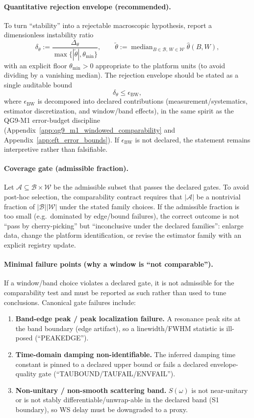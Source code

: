 \paragraph{Quantitative rejection envelope (recommended).}
\AuditTag To turn ``stability'' into a rejectable macroscopic hypothesis, report a dimensionless instability ratio
\[
\delta_\theta:=\frac{\Delta_\theta}{\max\{|\tilde\theta|,\theta_{\min}\}},
\qquad
\tilde\theta:=\operatorname{median}_{B\in\mathcal B,\,W\in\mathcal W}\widehat\theta(B,W),
\]
with an explicit floor $\theta_{\min}>0$ appropriate to the platform units (to avoid dividing by a vanishing median).
The rejection envelope should be stated as a single auditable bound
\[
\delta_\theta \le \epsilon_{\mathrm{BW}},
\]
where $\epsilon_{\mathrm{BW}}$ is decomposed into declared contributions (measurement/systematics, estimator discretization, and window/band effects),
in the same spirit as the QG9-M1 error-budget discipline (Appendix~\ref{app:qg9_m1_windowed_comparability} and Appendix~\ref{app:eft_error_bounds}).
If $\epsilon_{\mathrm{BW}}$ is not declared, the statement remains interpretive rather than falsifiable.

\paragraph{Coverage gate (admissible fraction).}
\AuditTag Let $\mathcal A\subseteq\mathcal B\times\mathcal W$ be the admissible subset that passes the declared gates.
To avoid post-hoc selection, the comparability contract requires that $|\mathcal A|$ be a nontrivial fraction of $|\mathcal B||\mathcal W|$ under the stated family choices.
If the admissible fraction is too small (e.g.\ dominated by edge/bound failures), the correct outcome is not ``pass by cherry-picking'' but ``inconclusive under the declared families'': enlarge data, change the platform identification, or revise the estimator family with an explicit registry update.

\paragraph{Minimal failure points (why a window is ``not comparable'').}
\AuditTag If a window/band choice violates a declared gate, it is not admissible for the comparability test and must be reported as such rather than used to tune conclusions.
Canonical gate failures include:
\begin{enumerate}
\item \textbf{Band-edge peak / peak localization failure.} A resonance peak sits at the band boundary (edge artifact), so a linewidth/FWHM statistic is ill-posed (``PEAKEDGE'').
\item \textbf{Time-domain damping non-identifiable.} The inferred damping time constant is pinned to a declared upper bound or fails a declared envelope-quality gate (``TAUBOUND/TAUFAIL/ENVFAIL'').
\item \textbf{Non-unitary / non-smooth scattering band.} $S(\omega)$ is not near-unitary or is not stably differentiable/unwrap-able in the declared band (S1 boundary), so WS delay must be downgraded to a proxy.
\end{enumerate}

